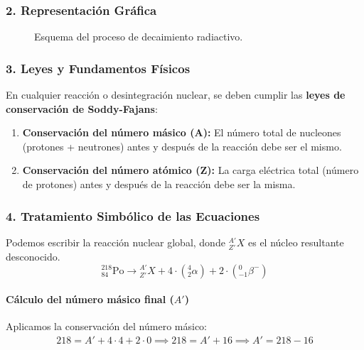 \subsubsection*{2. Representación Gráfica}
\begin{figure}[H]
    \centering
    \caption{Esquema del proceso de decaimiento radiactivo.}
\end{figure}

\subsubsection*{3. Leyes y Fundamentos Físicos}
En cualquier reacción o desintegración nuclear, se deben cumplir las \textbf{leyes de conservación de Soddy-Fajans}:
\begin{enumerate}
    \item \textbf{Conservación del número másico (A):} El número total de nucleones (protones + neutrones) antes y después de la reacción debe ser el mismo.
    \item \textbf{Conservación del número atómico (Z):} La carga eléctrica total (número de protones) antes y después de la reacción debe ser la misma.
\end{enumerate}

\subsubsection*{4. Tratamiento Simbólico de las Ecuaciones}
Podemos escribir la reacción nuclear global, donde ${}_{Z'}^{A'}X$ es el núcleo resultante desconocido.
$$ {}_{84}^{218}\text{Po} \longrightarrow {}_{Z'}^{A'}X + 4 \cdot ({}_{2}^{4}\alpha) + 2 \cdot ({}_{-1}^{0}\beta^{-}) $$
\paragraph{Cálculo del número másico final ($A'$)}
Aplicamos la conservación del número másico:
\begin{gather}
    218 = A' + 4 \cdot 4 + 2 \cdot 0 \implies 218 = A' + 16 \implies A' = 218 - 16
\end{gather}
